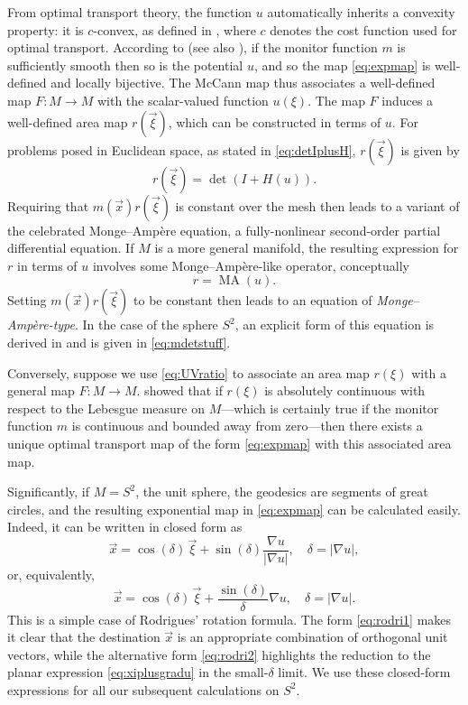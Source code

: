 \documentclass[11pt, a4paper]{scrartcl}  %
\theoremstyle{plain}
\theoremstyle{definition}
\numberwithin{equation}{section}
\begin{document}
From optimal transport theory, the function $u$ automatically inherits a
convexity property: it is $c$-convex, as defined in
\citet{mccann2001polar}, where $c$ denotes the cost function used for
optimal transport. According to \citet{mccann2001polar} (see also
\citet{loeper2011regularity}), if the monitor function $m$ is
sufficiently smooth then so is the potential $u$, and so the map
\cref{eq:expmap} is well-defined and locally bijective. The McCann map
thus associates a well-defined map $F: M \to M$ with the scalar-valued
function $u(\xi)$. The map $F$ induces a well-defined area map $r(\vec{\xi})$,
which can be constructed in terms of $u$. For problems posed in
Euclidean space, as stated in \cref{eq:detIplusH}, $r(\vec{\xi})$ is given by
\begin{equation}
  r(\vec{\xi}) = \det(I + H(u)).
\end{equation}
Requiring that $m(\vec{x}) r(\vec{\xi})$ is constant over the mesh then
leads to a variant of the celebrated Monge--Ampère equation, a
fully-nonlinear second-order partial differential equation. If $M$ is
a more general manifold, the resulting expression for $r$ in terms of
$u$ involves some Monge--Ampère-like operator, conceptually
\begin{equation}
  \label{eq:chrisaug2}
  r = \operatorname{MA}(u).
\end{equation}
Setting $m(\vec{x}) r(\vec{\xi})$ to be constant then leads to an
equation of {\em Monge--Ampère-type}. In the case of the sphere $S^2$,
an explicit form of this equation is derived in \citet{mcrae2018optimal}
and is given in \cref{eq:mdetstuff}.

Conversely, suppose we use \cref{eq:UVratio} to associate an area map
$r(\xi)$ with a general map $F: M \to M$. \citet{mccann2001polar} showed
that if $r(\xi)$ is absolutely continuous with respect to the Lebesgue
measure on $M$---which is certainly true if the monitor function $m$ is
continuous and bounded away from zero---then there exists a unique
optimal transport map of the form \cref{eq:expmap} with this associated
area map.

Significantly, if $M = S^2$, the unit sphere, the geodesics are segments
of great circles, and the resulting exponential map in \cref{eq:expmap}
can be calculated easily. Indeed, it can be written in closed form as
\begin{equation}
\label{eq:rodri1}
  \vec{x} = \cos(\delta)\, \vec{\xi} + \sin(\delta)\frac{\nabla u}{|\nabla u|}, \quad \delta = |\nabla u|,
\end{equation}
or, equivalently,
\begin{equation}
\label{eq:rodri2}
  \vec{x} = \cos(\delta)\, \vec{\xi} + \frac{\sin(\delta)}{\delta} \nabla u, \quad \delta = |\nabla u|.
\end{equation}
This is a simple case of Rodrigues' rotation formula. The form
\cref{eq:rodri1} makes it clear that the destination $\vec{x}$ is an
appropriate combination of orthogonal unit vectors, while the
alternative form \cref{eq:rodri2} highlights the reduction to the planar
expression \cref{eq:xiplusgradu} in the small-$\delta$ limit. We use
these closed-form expressions for all our subsequent calculations on
$S^2$.
\end{document}

